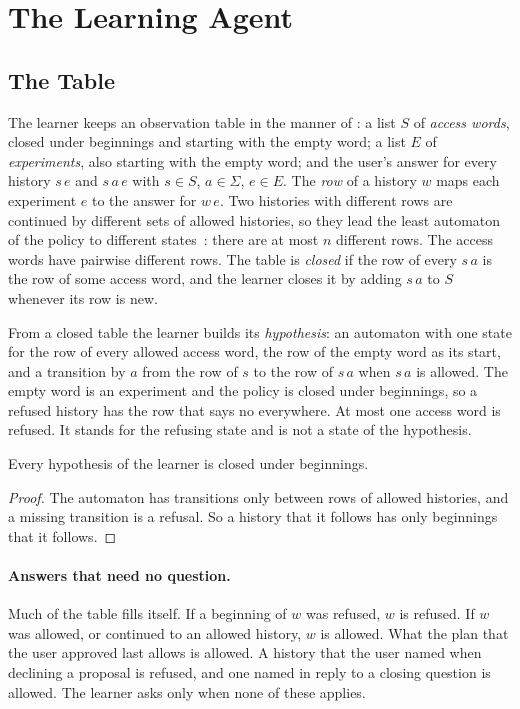\documentclass[acmsmall,nonacm,screen]{acmart}
\begin{document}
\section{The Learning Agent}
\label{sec:agent}

\subsection{The Table}

The learner keeps an observation table in the manner of \citet{angluin1987}: a list $S$ of
\emph{access words}, closed under beginnings and starting with the empty word; a list $E$ of
\emph{experiments}, also starting with the empty word; and the user's answer for every
history $s\,e$ and $s\,a\,e$ with $s \in S$, $a \in \Sigma$, $e \in E$. The \emph{row} of a
history $w$ maps each experiment $e$ to the answer for $w\,e$. Two histories with different
rows are continued by different sets of allowed histories, so they lead the least automaton
of the policy to different states~\cite{nerode1958}: there are at most $n$ different rows.
The access words have pairwise different rows. The table is \emph{closed} if the row of every
$s\,a$ is the row of some access word, and the learner closes it by adding $s\,a$ to $S$
whenever its row is new.

From a closed table the learner builds its \emph{hypothesis}: an automaton with one state for
the row of every allowed access word, the row of the empty word as its start, and a
transition by $a$ from the row of $s$ to the row of $s\,a$ when $s\,a$ is allowed. The empty
word is an experiment and the policy is closed under beginnings, so a refused history has
the row that says no everywhere. At most one access word is refused. It stands for the
refusing state and is not a state of the hypothesis.

\begin{lemma}
\label{lem:plans}
Every hypothesis of the learner is closed under beginnings.
\end{lemma}

\begin{proof}
The automaton has transitions only between rows of allowed histories, and a missing
transition is a refusal. So a history that it follows has only beginnings that it follows.
\end{proof}

\paragraph{Answers that need no question.} Much of the table fills itself. If a beginning of
$w$ was refused, $w$ is refused. If $w$ was allowed, or continued to an allowed history,
$w$ is allowed. What the plan that the user approved last allows is allowed. A history that
the user named when declining a proposal is refused, and one named in reply to a closing
question is allowed. The learner asks only when none of these applies.
\end{document}
